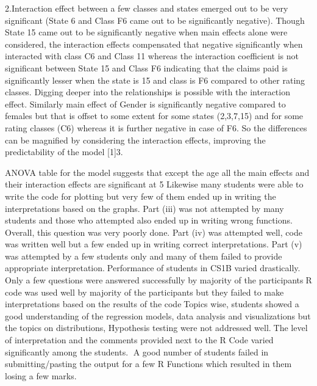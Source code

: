 2.Interaction effect between a few classes and states emerged out to be very significant (State 6 and Class F6 came out to be significantly negative). 
Though State 15 came out to be significantly negative when main effects alone were considered, the interaction effects compensated that negative significantly when interacted with class C6 and Class 11 whereas the interaction coefficient is not significant between State 15 and Class F6 indicating that the claims paid is significantly lesser when the state is 15 and class is F6 compared to other rating classes. 
Digging deeper into the relationships is possible with the interaction effect. Similarly main effect of Gender is significantly negative compared to females but that is offset to some extent for some states (2,3,7,15) and for some rating classes (C6) whereas it is further negative in case of F6. 
So the differences can be magnified by considering the interaction effects, improving the predictability of the model [1]3.

ANOVA table for the model suggests that except the age all the main effects and their interaction effects are significant at 5%
Likewise many students were able to write the code for plotting but very few of them ended up in writing the interpretations based on the graphs. Part (iii) was not attempted by many students and those who attempted also ended up in writing wrong functions. Overall, this question was very poorly done. 
Part (iv) was attempted well, code was written well but a few ended up in writing correct interpretations.
Part (v) was attempted by a few students only and many of them failed to provide appropriate interpretation.Performance of students in CS1B varied drastically. Only a few questions were answered successfully by majority of the participantsR code was used well by majority of the participants but they failed to make interpretations based on the results of the codeTopics wise, students showed a good understanding of the regression models, data analysis and visualizations but the topics on distributions, Hypothesis testing were not addressed well.The level of interpretation and the comments provided next to the R Code varied significantly among the students. A good number of students failed in submitting/pasting the output for a few R Functions which resulted in them losing a few marks.

